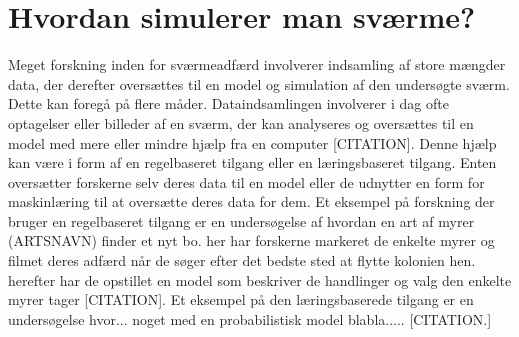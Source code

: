 \section{Hvordan simulerer man sværme?} \label{ch:hvordansvaerme}
Meget forskning inden for sværmeadfærd involverer indsamling af store mængder data, der derefter oversættes til en model og simulation af den undersøgte sværm. Dette kan foregå på flere måder. Dataindsamlingen involverer i dag ofte optagelser eller billeder af en sværm, der kan analyseres og oversættes til en model med mere eller mindre hjælp fra en computer [CITATION]. Denne hjælp kan være i form af en  regelbaseret tilgang eller en læringsbaseret tilgang. Enten oversætter forskerne selv deres data til en model eller de udnytter en form for maskinlæring til at oversætte deres data for dem. Et eksempel på forskning der bruger en regelbaseret tilgang er en undersøgelse af hvordan en art af myrer (ARTSNAVN) finder et nyt bo. her har forskerne markeret de enkelte myrer og filmet deres adfærd når de søger efter det bedste sted at flytte kolonien hen. herefter har de opstillet en model som beskriver de handlinger og valg den enkelte myrer tager [CITATION].
Et eksempel på den læringsbaserede tilgang er en undersøgelse hvor... noget med en probabilistisk model blabla..... [CITATION.]




